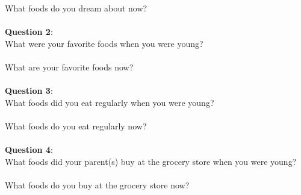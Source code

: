 \documentclass[11pt]{article}
\numberwithin{figure}{section}
\numberwithin{table}{section}
\begin{document}
\noindent What foods do you dream about now? \\
~\\


\noindent\textbf{Question 2}: \\
\noindent What were your favorite foods when you were young?  \\
~\\

\noindent What are your favorite foods now? \\
~\\


\noindent\textbf{Question 3}: \\
\noindent What foods did you eat regularly when you were young?  \\
~\\

\noindent What foods do you eat regularly now? \\
~\\


\noindent\textbf{Question 4}: \\
\noindent What foods did your parent(s) buy at the grocery store when you were young?\\
~\\

\noindent What foods do you buy at the grocery store now?
\end{document}
